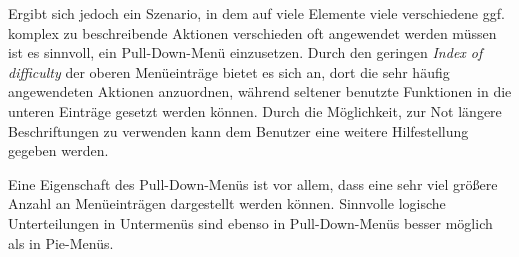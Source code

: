 \documentclass[a4paper,10pt]{article}
\begin{document}
\begin{enumerate}
Ergibt sich jedoch ein Szenario, in dem auf viele Elemente viele verschiedene ggf. komplex zu beschreibende Aktionen verschieden oft angewendet werden müssen ist es sinnvoll, ein Pull-Down-Menü einzusetzen. Durch den geringen \textit{Index of difficulty} der oberen Menüeinträge bietet es sich an, dort die sehr häufig angewendeten Aktionen anzuordnen, während seltener benutzte Funktionen in die unteren Einträge gesetzt werden können. Durch die Möglichkeit, zur Not längere Beschriftungen zu verwenden kann dem Benutzer eine weitere Hilfestellung gegeben werden.

Eine Eigenschaft des Pull-Down-Menüs ist vor allem, dass eine sehr viel größere Anzahl an Menüeinträgen dargestellt werden können. Sinnvolle logische Unterteilungen in Untermenüs sind ebenso in Pull-Down-Menüs besser möglich als in Pie-Menüs.
\end{enumerate}
\end{document}
